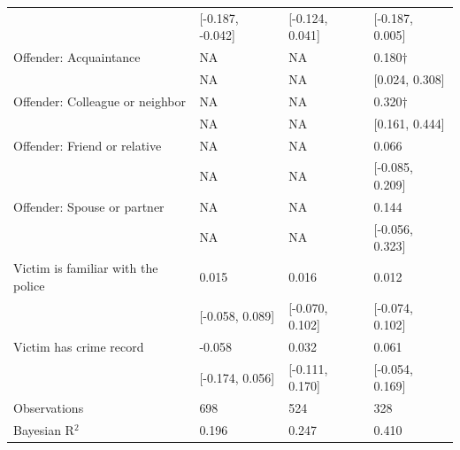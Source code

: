 \begin{tabular}[t]{llll}
 & {}[-0.187, -0.042] & {}[-0.124, 0.041] & {}[-0.187, 0.005]\\
Offender: Acquaintance & NA & NA & 0.180$\dagger$\\
 & NA & NA & {}[0.024, 0.308]\\
Offender: Colleague or neighbor & NA & NA & 0.320$\dagger$\\
 & NA & NA & {}[0.161, 0.444]\\
Offender: Friend or relative & NA & NA & 0.066\\
 & NA & NA & {}[-0.085, 0.209]\\
Offender: Spouse or partner & NA & NA & 0.144\\
 & NA & NA & {}[-0.056, 0.323]\\
Victim is familiar with the police & 0.015 & 0.016 & 0.012\\
 & {}[-0.058, 0.089] & {}[-0.070, 0.102] & {}[-0.074, 0.102]\\
Victim has crime record & -0.058 & 0.032 & 0.061\\
 & {}[-0.174, 0.056] & {}[-0.111, 0.170] & {}[-0.054, 0.169]\\
\midrule
Observations & 698 & 524 & 328\\
Bayesian R$^2$ & 0.196 & 0.247 & 0.410\\
\bottomrule
\end{tabular}